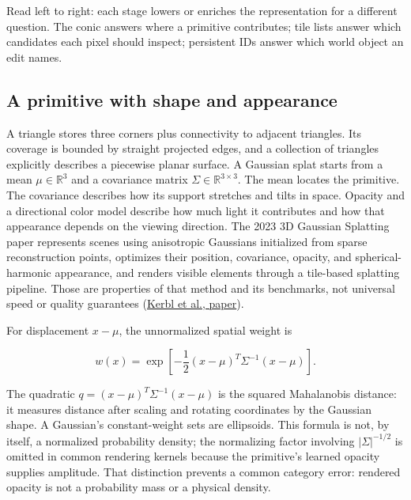 
Read left to right: each stage lowers or enriches the representation for a different question. The conic answers where a primitive contributes; tile lists answer which candidates each pixel should inspect; persistent IDs answer which world object an edit names.

\subsection{A primitive with shape and appearance}\label{04-visual-computing-ii-ch037-a-primitive-with-shape-and-appearance}

\hypertarget{04-visual-computing-ii-ch037-a-primitive-with-shape-and-appearance}{}

A triangle stores three corners plus connectivity to adjacent triangles. Its coverage is bounded by straight projected edges, and a collection of triangles explicitly describes a piecewise planar surface. A Gaussian splat starts from a mean \(\mu\in\mathbb R^3\) and a covariance matrix \(\Sigma\in\mathbb R^{3\times3}\). The mean locates the primitive. The covariance describes how its support stretches and tilts in space. Opacity and a directional color model describe how much light it contributes and how that appearance depends on the viewing direction. The 2023 3D Gaussian Splatting paper represents scenes using anisotropic Gaussians initialized from sparse reconstruction points, optimizes their position, covariance, opacity, and spherical-harmonic appearance, and renders visible elements through a tile-based splatting pipeline. Those are properties of that method and its benchmarks, not universal speed or quality guarantees (\href{https://arxiv.org/abs/2308.04079}{Kerbl et al., paper}).

For displacement \(x-\mu\), the unnormalized spatial weight is

\[
w(x)=\exp\left[-\frac12(x-\mu)^T\Sigma^{-1}(x-\mu)\right].
\]

The quadratic \(q=(x-\mu)^T\Sigma^{-1}(x-\mu)\) is the squared Mahalanobis distance: it measures distance after scaling and rotating coordinates by the Gaussian shape. A Gaussian's constant-weight sets are ellipsoids. This formula is not, by itself, a normalized probability density; the normalizing factor involving \(|\Sigma|^{-1/2}\) is omitted in common rendering kernels because the primitive's learned opacity supplies amplitude. That distinction prevents a common category error: rendered opacity is not a probability mass or a physical density.


